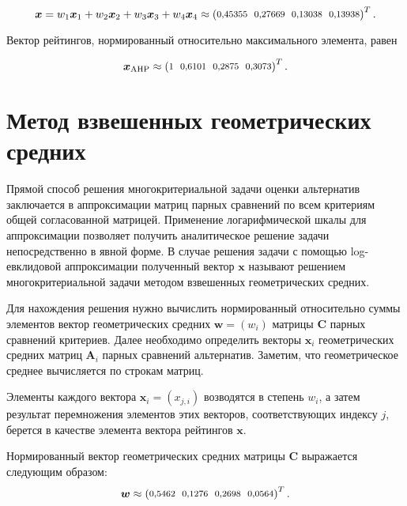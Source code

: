 \documentclass{math-mech-sci}
\begin{document}
$$
\boldsymbol{x}=w_1 \boldsymbol{x}_1+w_2 \boldsymbol{x}_2+w_3\boldsymbol{x}_3+w_4 \boldsymbol{x}_4\approx 
\setlength{\arraycolsep}{3pt}
\footnotesize
\begin{pmatrix}
0{,}45355 & 0{,}27669 & 0{,}13038 & 0{,}13938
\end{pmatrix}^T.
$$
\vspace{-0.5ex}

Вектор рейтингов, нормированный относительно максимального элемента, равен
\vspace{-0.5ex}

\[
\boldsymbol{x}_{\mathrm{AHP}}\approx 
\setlength{\arraycolsep}{3pt}
\footnotesize
 \begin{pmatrix}
1 &  0{,}6101 &  0{,}2875 & 0{,}3073
\end{pmatrix}^T.
\]

\section{Метод взвешенных геометрических
средних}

Прямой способ решения многокритериальной задачи оценки альтернатив заключается в аппроксимации матриц парных
сравнений по всем критериям общей согласованной матрицей. Применение логарифмической шкалы для аппроксимации позволяет получить аналитическое решение задачи непосредственно в явной форме. В случае решения задачи с помощью log-евклидовой аппроксимации полученный вектор $\boldsymbol{x}$ называют решением многокритериальной задачи методом взвешенных геометрических средних.

Для нахождения решения нужно вычислить нормированный относительно суммы элементов вектор геометрических средних $\boldsymbol{w}=(w_{i})$ матрицы $\boldsymbol{C}$ парных сравнений критериев. Далее необходимо определить векторы $\boldsymbol{x}_{i}$ геометрических средних матриц $\boldsymbol{A}_{i}$ парных сравнений альтернатив. Заметим, что геометрическое среднее вычисляется по строкам матриц. 

Элементы каждого вектора $\boldsymbol{x}_i=(x_{j, i})$ возводятся в степень $w_i$, а затем результат перемножения элементов этих векторов, соответствующих индексу $j$, берется в качестве элемента вектора рейтингов $\boldsymbol{x}$.
\vspace{1ex}

Нормированный вектор геометрических средних матрицы $\boldsymbol{C}$ выражается следующим образом:
$$
\boldsymbol{w}\approx
\setlength{\arraycolsep}{3pt}
\footnotesize
\begin{pmatrix}
0{,}5462 & 0{,}1276 & 0{,}2698 & 0{,}0564
\end{pmatrix}^T.
$$
\newpage
\end{document}
